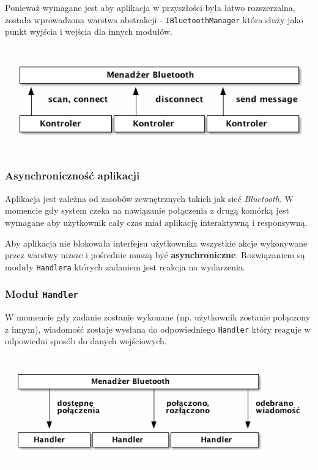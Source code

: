 \documentclass[a4paper, titlepage]{article}
\begin{document}
Ponieważ wymagane jest aby aplikacja w przyszłości była łatwo rozszerzalna, została wprowadzona warstwa abstrakcji - \texttt{IBluetoothManager} która służy jako punkt wyjścia i wejścia dla innych modułów.

\includegraphics[width=.9\linewidth]{BM.png}

\subsubsection{Asynchroniczność aplikacji}
\label{sec-1-2-2}
Aplikacja jest zależna od zasobów zewnętrznych takich jak sieć \emph{Bluetooth}. W momencie gdy system czeka na nawiązanie połączenia z drugą komórką jest wymagane aby użytkownik cały czas miał aplikację interaktywną i responsywną. 

Aby aplikacja nie blokowała interfejsu użytkownika wszystkie akcje wykonywane przez warstwy niższe i pośrednie muszą być \textbf{asynchroniczne}.
Rozwiązaniem są moduły \texttt{Handlera} których zadaniem jest reakcja na wydarzenia.
\subsubsection{Moduł \texttt{Handler}}
\label{sec-1-2-3}
W momencie gdy zadanie zostanie wykonane (np. użytkownik zostanie połączony z innym), wiadomość zostaje wysłana do odpowiedniego \texttt{Handler} który reaguje w odpowiedni sposób do danych wejściowych.

\includegraphics[width=.9\linewidth]{Handler.png}
\end{document}
